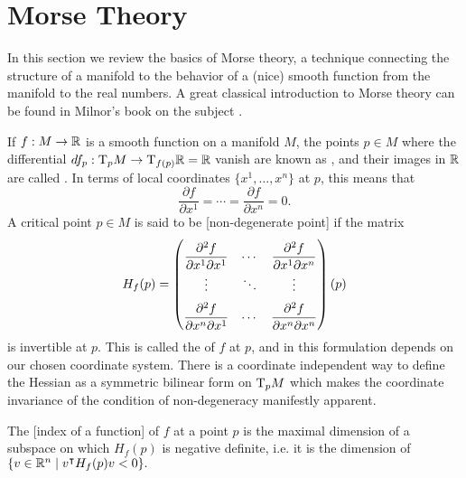 \section{Morse Theory}\label{sec:morse-theory}

In this section we review the basics of Morse theory, a technique connecting the structure of a manifold to the behavior of a (nice) smooth function from the manifold to the real numbers. A great classical introduction to Morse theory can be found in Milnor's book on the subject \cite{milnor1963morse}.

If $f : M \to \mathbb{R}$ is a smooth function on a manifold $M$, the points $p\in M$ where the differential $df_p : \mathrm{T}_p M \to \mathrm{T}_{f(p)} \mathbb{R} = \mathbb{R}$ vanish are known as , and their images in $\mathbb{R}$ are called . In terms of local coordinates $\{x^1,\ldots, x^n\}$ at $p$, this means that
\begin{equation}
	\frac{\partial f}{\partial x^1}=\cdots=\frac{\partial f}{\partial x^n} = 0.
\end{equation}
A critical point $p\in M$ is said to be [non-degenerate point] if the matrix
\begin{equation}
	\everymath={\displaystyle}
	\renewcommand*{\arraystretch}{2}
	H_f(p) = \begin{pmatrix}
		\frac{\partial^2 f}{\partial x^1\partial x^1} & \cdots &
		\frac{\partial^2 f}{\partial x^1\partial x^n}                   \\
		\vdots                                        & \ddots & \vdots \\
		\frac{\partial^2 f}{\partial x^n\partial x^1} & \cdots &
		\frac{\partial^2 f}{\partial x^n\partial x^n}                   \\
	\end{pmatrix}(p)
\end{equation}
is invertible at $p$. This is called the  of $f$ at $p$, and in this formulation depends on our chosen coordinate system.
There is a coordinate independent way to define the Hessian as a symmetric bilinear form on $\mathrm{T}_p M$ which makes the coordinate invariance of the condition of non-degeneracy manifestly apparent.

\begin{definition}
	The [index of a function] of $f$ at a point $p$ is the maximal dimension of a subspace on which $H_f(p)$ is negative definite, i.e. it is the dimension of $\{v\in \mathbb{R}^n \mid v^\intercal H_f(p) v < 0\}.$
\end{definition}

